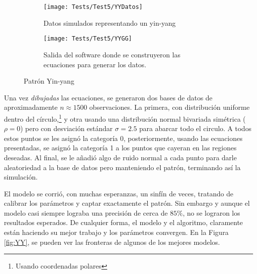 \documentclass[../Main/Main.tex]{subfiles}
\begin{document}
\begin{figure}[h]
        \centering
        \begin{subfigure}[b]{0.45\textwidth}
            \centering
            \texttt{[image: Tests/Test5/YYDatos]}
            \caption{Datos simulados representando un yin-yang}   
            \label{fig:YYDatos}
        \end{subfigure}
        \hfill
        \begin{subfigure}[b]{0.45\textwidth}  
            \centering 
            \texttt{[image: Tests/Test5/YYGG]}
            \caption{Salida del software donde se construyeron las ecuaciones para generar los datos.}
            \label{fig:YYGG}
        \end{subfigure}
        \caption{Patrón Yin-yang}
        \label{fig:YYInitialPlots}
\end{figure}
Una vez \textit{dibujadas} las ecuaciones, se generaron dos bases de datos de aproximadamente $n \approx 1500$ observaciones. La primera, con distribución uniforme dentro del círculo,\footnote{Usando coordenadas polares} y otra usando una distribución normal bivariada simétrica ($\rho = 0$) pero con desviación estándar $\sigma = 2.5$ para abarcar todo el circulo. A todos estos puntos se les asignó la categoría 0, posteriormente, usando las ecuaciones presentadas, se asignó la categoría 1 a los puntos que cayeran en las regiones deseadas. Al final, se le añadió algo de ruido normal a cada punto para darle aleatoriedad a la base de datos pero manteniendo el patrón, terminando así la simulación.

El modelo se corrió, con muchas esperanzas, un sinfín de veces, tratando de calibrar los parámetros y captar exactamente el patrón. Sin embargo y aunque el modelo casi siempre lograba una precisión de cerca de $85\%$, no se lograron los resultados esperados. De cualquier forma, el modelo y el algoritmo, claramente están haciendo su mejor trabajo y los parámetros convergen. En la Figura \ref{fig:YY}, se pueden ver las fronteras de algunos de los mejores modelos.
\end{document}
